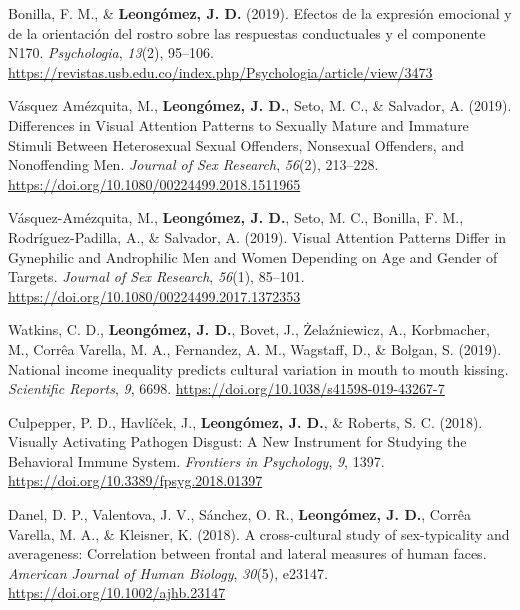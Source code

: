 \documentclass[11pt, a4paper]{awesome-cv}
\begin{document}
\leavevmode{}%
Bonilla, F. M., \& \textbf{Leongómez, J. D.} (2019). {Efectos de la
expresi{ó}n emocional y de la orientaci{ó}n del rostro sobre las
respuestas conductuales y el componente N170}. \emph{Psychologia},
\emph{13}(2), 95--106.
\url{https://revistas.usb.edu.co/index.php/Psychologia/article/view/3473}

\leavevmode{}%
Vásquez Amézquita, M., \textbf{Leongómez, J. D.}, Seto, M. C., \&
Salvador, A. (2019). {Differences in Visual Attention Patterns to
Sexually Mature and Immature Stimuli Between Heterosexual Sexual
Offenders, Nonsexual Offenders, and Nonoffending Men}. \emph{Journal of
Sex Research}, \emph{56}(2), 213--228.
\url{https://doi.org/10.1080/00224499.2018.1511965}

\leavevmode{}%
Vásquez-Amézquita, M., \textbf{Leongómez, J. D.}, Seto, M. C., Bonilla,
F. M., Rodríguez-Padilla, A., \& Salvador, A. (2019). {Visual Attention
Patterns Differ in Gynephilic and Androphilic Men and Women Depending on
Age and Gender of Targets}. \emph{Journal of Sex Research},
\emph{56}(1), 85--101.
\url{https://doi.org/10.1080/00224499.2017.1372353}

\leavevmode{}%
Watkins, C. D., \textbf{Leongómez, J. D.}, Bovet, J., Żelaźniewicz, A.,
Korbmacher, M., Corrêa Varella, M. A., Fernandez, A. M., Wagstaff, D.,
\& Bolgan, S. (2019). {National income inequality predicts cultural
variation in mouth to mouth kissing}. \emph{Scientific Reports},
\emph{9}, 6698. \url{https://doi.org/10.1038/s41598-019-43267-7}

\leavevmode{}%
Culpepper, P. D., Havlíček, J., \textbf{Leongómez, J. D.}, \& Roberts,
S. C. (2018). {Visually Activating Pathogen Disgust: A New Instrument
for Studying the Behavioral Immune System}. \emph{Frontiers in
Psychology}, \emph{9}, 1397.
\url{https://doi.org/10.3389/fpsyg.2018.01397}

\leavevmode{}%
Danel, D. P., Valentova, J. V., Sánchez, O. R.,
\textbf{Leongómez, J. D.}, Corrêa Varella, M. A., \& Kleisner, K.
(2018). {A cross-cultural study of sex-typicality and averageness:
Correlation between frontal and lateral measures of human faces}.
\emph{American Journal of Human Biology}, \emph{30}(5), e23147.
\url{https://doi.org/10.1002/ajhb.23147}
\end{document}
